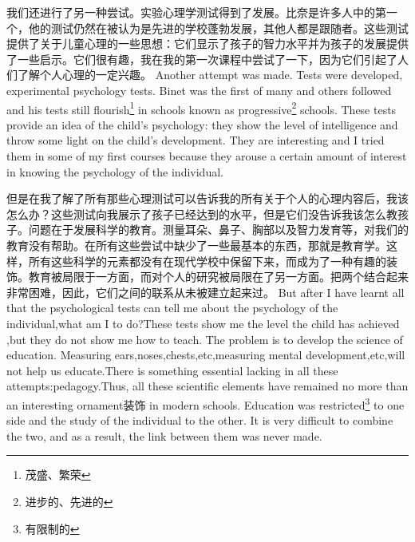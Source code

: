 \documentclass[lang=cn,10pt]{elegantbook}
\begin{document}
\begin{tcolorbox}[title=译文,
colback=red!5!white,
colframe=red!75!black,
fonttitle=\bfseries]
我们还进行了另一种尝试。实验心理学测试得到了发展。比奈是许多人中的第一个，他的测试仍然在被认为是先进的学校蓬勃发展，其他人都是跟随者。这些测试提供了关于儿童心理的一些思想：它们显示了孩子的智力水平并为孩子的发展提供了一些启示。它们很有趣，我在我的第一次课程中尝试了一下，因为它们引起了人们了解个人心理的一定兴趣。
Another attempt was made. Tests were developed, experimental psychology tests. Binet was the first of many and others followed and his tests still flourish\footnote{茂盛、繁荣} in schools known as progressive\footnote{进步的、先进的} schools. These tests provide an idea of the child's psychology: they show the level of intelligence and throw some light on the child's development. They are interesting and I tried them in some of my first courses because they arouse a certain amount of interest in knowing the psychology of the individual.
\end{tcolorbox}

\begin{tcolorbox}[title=译文,
colback=red!5!white,
colframe=red!75!black,
fonttitle=\bfseries]
但是在我了解了所有那些心理测试可以告诉我的所有关于个人的心理内容后，我该怎么办？这些测试向我展示了孩子已经达到的水平，但是它们没告诉我该怎么教孩子。问题在于发展科学的教育。测量耳朵、鼻子、胸部以及智力发育等，对我们的教育没有帮助。在所有这些尝试中缺少了一些最基本的东西，那就是教育学。这样，所有这些科学的元素都没有在现代学校中保留下来，而成为了一种有趣的装饰。教育被局限于一方面，而对个人的研究被局限在了另一方面。把两个结合起来非常困难，因此，它们之间的联系从未被建立起来过。
But after I have learnt all that the psychological tests can tell me about the psychology of  the individual,what am I to do?These tests show me the level the child has achieved ,but they do not show me how to teach. The problem is to develop the science of education. Measuring ears,noses,chests,etc,measuring mental development,etc,will not help us educate.There is something essential lacking in all these attempts:pedagogy.Thus, all these scientific elements have remained no more than an interesting ornament装饰 in modern schools. Education was restricted\footnote{有限制的} to one side and the study of the individual to the other. It is very difficult to combine the two, and as a result, the link between them was never made.
\end{tcolorbox}
\end{document}
